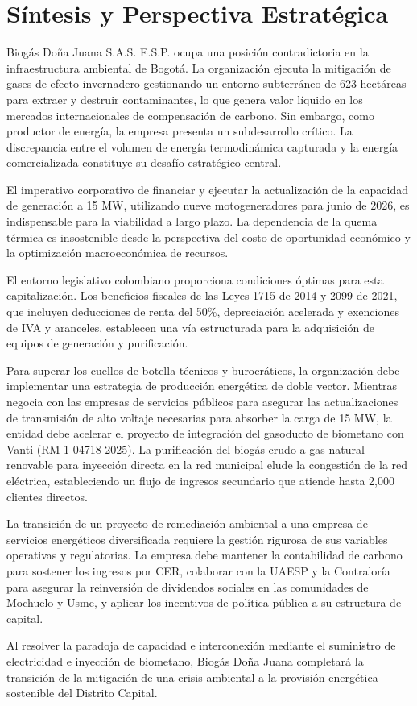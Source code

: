 \documentclass[11pt,letterpaper]{article}
\begin{document}
\newpage

\section{Síntesis y Perspectiva Estratégica}

Biogás Doña Juana S.A.S. E.S.P. ocupa una posición contradictoria en la
infraestructura ambiental de Bogotá. La organización ejecuta la mitigación de
gases de efecto invernadero gestionando un entorno subterráneo de 623 hectáreas
para extraer y destruir contaminantes, lo que genera valor líquido en los
mercados internacionales de compensación de carbono. Sin embargo, como productor
de energía, la empresa presenta un subdesarrollo crítico. La discrepancia entre
el volumen de energía termodinámica capturada y la energía comercializada
constituye su desafío estratégico central.

El imperativo corporativo de financiar y ejecutar la actualización de la
capacidad de generación a 15 MW, utilizando nueve motogeneradores para junio de
2026, es indispensable para la viabilidad a largo plazo. La dependencia de la
quema térmica es insostenible desde la perspectiva del costo de oportunidad
económico y la optimización macroeconómica de recursos.

El entorno legislativo colombiano proporciona condiciones óptimas para esta
capitalización. Los beneficios fiscales de las Leyes 1715 de 2014 y 2099 de
2021, que incluyen deducciones de renta del 50\%, depreciación acelerada y
exenciones de IVA y aranceles, establecen una vía estructurada para la
adquisición de equipos de generación y purificación.

Para superar los cuellos de botella técnicos y burocráticos, la organización
debe implementar una estrategia de producción energética de doble vector.
Mientras negocia con las empresas de servicios públicos para asegurar las
actualizaciones de transmisión de alto voltaje necesarias para absorber la carga
de 15 MW, la entidad debe acelerar el proyecto de integración del gasoducto de
biometano con Vanti (RM-1-04718-2025). La purificación del biogás crudo a gas
natural renovable para inyección directa en la red municipal elude la congestión
de la red eléctrica, estableciendo un flujo de ingresos secundario que atiende
hasta 2,000 clientes directos.

La transición de un proyecto de remediación ambiental a una empresa de servicios
energéticos diversificada requiere la gestión rigurosa de sus variables
operativas y regulatorias. La empresa debe mantener la contabilidad de carbono
para sostener los ingresos por CER, colaborar con la UAESP y la Contraloría para
asegurar la reinversión de dividendos sociales en las comunidades de Mochuelo y
Usme, y aplicar los incentivos de política pública a su estructura de capital.

Al resolver la paradoja de capacidad e interconexión mediante el suministro de
electricidad e inyección de biometano, Biogás Doña Juana completará la
transición de la mitigación de una crisis ambiental a la provisión energética
sostenible del Distrito Capital.

\newpage

\printbibliography

\nocite{*}
\end{document}

